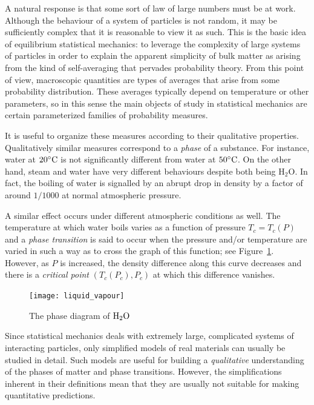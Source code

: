 A natural response is that some sort of law of large numbers
must be at work. Although the behaviour of a system of particles is not random, it may
be sufficiently complex that it is reasonable to view it as such.
This is the basic idea of equilibrium statistical mechanics: to leverage the complexity of
large systems of particles in order to explain the apparent simplicity of bulk
matter as arising from the kind of self-averaging that pervades probability
theory. From this point of view, macroscopic quantities are types of averages that
arise from some probability distribution. These averages typically depend on
temperature or other parameters, so in this sense the main objects of study in
statistical mechanics are certain parameterized families of probability measures.

It is useful to organize these measures according to their qualitative properties.
Qualitatively similar measures correspond to a \emph{phase} of a substance. For
instance, water at $20^\circ{\rm C}$ is not significantly different from water at
$50^\circ{\rm C}$. On the other hand, steam and water have very different behaviours
despite both being $\mathrm{H_2O}$. In fact, the boiling of water is signalled by an
abrupt drop in density by a factor of around $1/1000$ at normal atmospheric pressure.

A similar effect occurs under different atmospheric conditions as well. The temperature
at which water
boils varies as a function of pressure $T_c = T_c(P)$ and a \emph{phase transition}
is said to occur when the pressure and/or temperature are varied in such a way as to
cross the graph of this function; see Figure~\ref{fig:liquid-vapour}.
However, as $P$ is increased, the density difference along this curve decreases and
there is a \emph{critical point} $(T_c(P_c), P_c)$ at which this difference vanishes.

\begin{figure}
\centering
\label{fig:liquid-vapour}
\texttt{[image: liquid\_vapour]}
\caption[Phase diagram of $\rm H_2 O$]{The phase diagram of $\rm H_2 O$}
\end{figure}

Since statistical mechanics deals with extremely large, complicated systems of
interacting particles, only simplified models of real materials can usually be
studied in detail. Such models are useful for building a
\emph{qualitative} understanding of the phases of matter and phase transitions.
However, the simplifications inherent in their definitions mean that they are
usually not suitable for making quantitative predictions.


